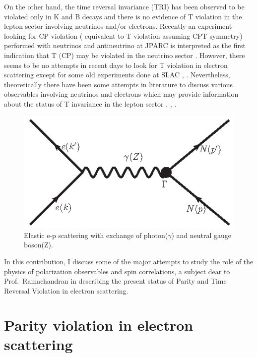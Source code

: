 On the other hand, the time reversal invariance (TRI) has been observed to be violated only in K and B decays and there is no evidence of T  violation in the  lepton sector  involving neutrinos and/or  electrons.  Recently an experiment looking for CP  violation ( equivalent to T    violation assuming CPT symmetry) performed with neutrinos and antineutrino at JPARC  is  interpreted as the first indication that T (CP) may be violated in the neutrino sector \cite{chap9-key17}. However,  there seems to be no attempts in recent days to look for T  violation  in electron scattering except for some old experiments done at SLAC \cite{chap9-key18}, \cite{chap9-key19}. Nevertheless, theoretically there have been some attempts in literature to discuss various  observables involving neutrinos and electrons which may provide information about the status of T  invariance in the lepton  sector  \cite{chap9-key14}, \cite{chap9-key15}, \cite{chap9-key21}. 
\begin{figure}[H]
\centering
\includegraphics[scale=0.6]{src/images/chap9/fig1.jpg}
\caption{Elastic e-p scattering with exchange of photon($\gamma$) and neutral gauge boson(Z).}\label{chap9-fig1}
\end{figure}
      
   
   
In this contribution,  I discuss some of the major  attempts to study the role of the physics of polarization observables and spin correlations, a subject dear to Prof.\ Ramachandran in describing the present status of Parity and Time Reversal Violation in electron scattering.
    
\section{Parity violation in electron scattering}\label{chap9-sec3}
     
